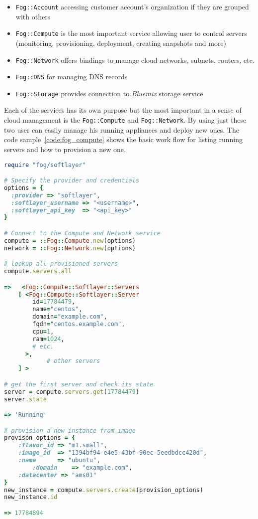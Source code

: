 \begin{itemize}
	\item \verb|Fog::Account| accessing customer account's organization if they are grouped with others
	\item \verb|Fog::Compute| is the most important service allowing user to control servers (monitoring, provisioning, deployment, creating snapshots and more)
	\item \verb|Fog::Network| offers bindings to manage cloud networks, subnets, routers, etc.
	\item \verb|Fog::DNS| for managing DNS records
	\item \verb|Fog::Storage| provides connection to \emph{Bluemix} storage service
\end{itemize}

Each of the services has its own purpose but the most important in a sense of cloud management is the \verb|Fog::Compute| and \verb|Fog::Network|. By using just these two user can easily manage his running appliances and deploy new ones. The code sample~\ref{code:fog_compute} shows the basic work flow for listing running servers and how to provision a new one.

\begin{lstlisting}[language=Ruby,caption={Example work flow for Fog SoftLayer},label=code:fog_compute,float=htpb]
require "fog/softlayer"

# Specify the provider and credentials
options = {
  :provider => "softlayer",
  :softlayer_username => "<username>",
  :softlayer_api_key  => "<api_key>"
}

# Connect to the Compute and Network service
compute = ::Fog::Compute.new(options)
network = ::Fog::Network.new(options)

# lookup all provisioned servers
compute.servers.all

=>   <Fog::Compute::Softlayer::Servers
    [ <Fog::Compute::Softlayer::Server
        id=17784479,
        name="centos",
        domain="example.com",
        fqdn="centos.example.com",
        cpu=1,
        ram=1024,
        # etc.
      >,
			# other servers
    ] >

# get the first server and check its state
server = compute.servers.get(17784479)
server.state

=> 'Running'

# provision a new instance from image
provison_options = {
    :flavor_id => "m1.small",
    :image_id  => "1394bf94-e4e5-43bf-90ec-5eedbdcc420d",
    :name      => "ubuntu",
		:domain    => "example.com",
    :datacenter => "ams01"
}
new_instance = compute.servers.create(provision_options)
new_instance.id

=> 17784894
\end{lstlisting}

